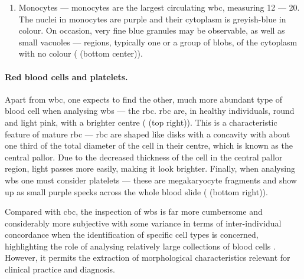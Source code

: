 \begin{enumerate}
    \item{Monocytes} --- monocytes are the largest circulating \ac{wbc}, measuring 12 --- 20\Mum. The nuclei in monocytes are purple and their cytoplasm is greyish-blue in colour. On occasion, very fine blue granules may be observable, as well as small vacuoles --- regions, typically one or a group of blobs, of the cytoplasm with no colour \cite{Bain2014-oc} ( (bottom center)).
\end{enumerate}

\begin{figure}[!ht]
	\label{fig:blood-cell-examples}
\end{figure}

\paragraph{Red blood cells and platelets.} Apart from \ac{wbc}, one expects to find the other, much more abundant type of blood cell when analysing \ac{wbs} --- the \ac{rbc}. \ac{rbc} are, in healthy individuals, round and light pink, with a brighter centre \cite{Bain2014-oc} ( (top right)). This is a characteristic feature of mature \ac{rbc} --- \ac{rbc} are shaped like disks with a concavity with about one third of the total diameter of the cell in their centre, which is known as the central pallor. Due to the decreased thickness of the cell in the central pallor region, light passes more easily, making it look brighter. Finally, when analysing \ac{wbs} one must consider platelets --- these are megakaryocyte fragments and show up as small purple specks across the whole blood slide \cite{Bain2014-oc,Wright1906-af} ( (bottom right)).

Compared with \ac{cbc}, the inspection of \ac{wbs} is far more cumbersome and considerably more subjective with some variance in terms of inter-individual concordance when the identification of specific cell types is concerned, highlighting the role of analysing relatively large collections of blood cells \cite{De_Swart2017-wc}. However, it permits the extraction of morphological characteristics relevant for clinical practice and diagnosis.

